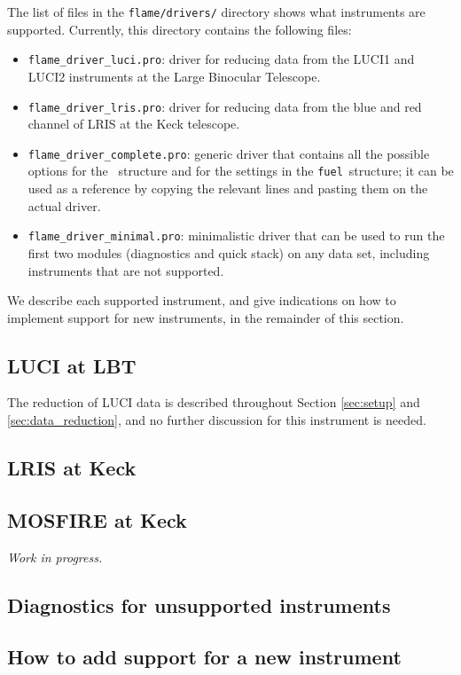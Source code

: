 \documentclass[a4paper]{article}
\newcommand{\fuel}{\texttt{fuel}}
\begin{document}
\begin{sloppypar}
The list of files in the \texttt{flame/drivers/} directory shows what instruments are supported. Currently, this directory contains the following files:
\begin{itemize}
  \item[] \texttt{flame\_driver\_luci.pro}: driver for reducing data from the LUCI1 and LUCI2 instruments at the Large Binocular Telescope.
  \item[] \texttt{flame\_driver\_lris.pro}: driver for reducing data from the blue and red channel of LRIS at the Keck telescope.
  \item[] \texttt{flame\_driver\_complete.pro}: generic driver that contains all the possible options for the \ structure and for the settings in the \fuel\ structure; it can be used as a reference by copying the relevant lines and pasting them on the actual driver.
  \item[] \texttt{flame\_driver\_minimal.pro}: minimalistic driver that can be used to run the first two modules (diagnostics and quick stack) on any data set, including instruments that are not supported.
\end{itemize}

We describe each supported instrument, and give indications on how to implement support for new instruments, in the remainder of this section.


\subsection{LUCI at LBT}

The reduction of LUCI data is described throughout Section \ref{sec:setup} and \ref{sec:data_reduction}, and no further discussion for this instrument is needed.


\subsection{LRIS at Keck}


\subsection{MOSFIRE at Keck}

\emph{Work in progress.}



\subsection{Diagnostics for unsupported instruments}
\label{sec:minimal}


\subsection{How to add support for a new instrument}





\end{sloppypar}
\end{document}
